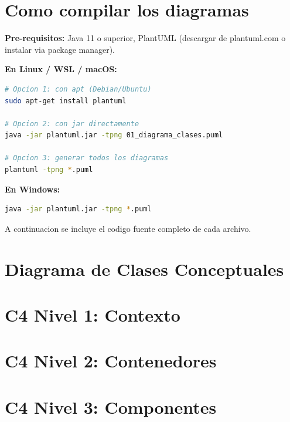 \section{Como compilar los diagramas}

\textbf{Pre-requisitos:} Java 11 o superior, PlantUML (descargar  de plantuml.com o instalar via package manager).

\textbf{En Linux / WSL / macOS:}

\begin{lstlisting}[language=bash]
# Opcion 1: con apt (Debian/Ubuntu)
sudo apt-get install plantuml

# Opcion 2: con jar directamente
java -jar plantuml.jar -tpng 01_diagrama_clases.puml

# Opcion 3: generar todos los diagramas
plantuml -tpng *.puml
\end{lstlisting}

\textbf{En Windows:}

\begin{lstlisting}[language=bash]
java -jar plantuml.jar -tpng *.puml
\end{lstlisting}

A continuacion se incluye el codigo fuente completo de cada archivo.

\section{Diagrama de Clases Conceptuales}


\section{C4 Nivel 1: Contexto}


\section{C4 Nivel 2: Contenedores}


\section{C4 Nivel 3: Componentes}


